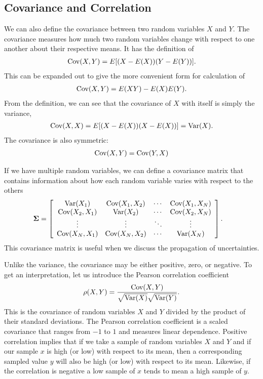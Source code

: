 \subsection{Covariance and Correlation}

We can also define the covariance between two random variables $X$ and $Y$. The covariance measures how much two random variables change with respect to one another about their respective means. It has the definition of
\begin{align}
  \textrm{Cov} (X,Y) = E[ (X - E(X) ) ( Y - E(Y) ) ] .
\end{align}
This can be expanded out to give the more convenient form for calculation of
\begin{align}
  \textrm{Cov} (X,Y) = E(XY) - E(X) E(Y) .
\end{align}
From the definition, we can see that the covariance of $X$ with itself is simply the variance,
\begin{align}
  \textrm{Cov} (X,X) = E[ (X - E(X) ) ( X - E(X) ) ] = \textrm{Var}(X) .
\end{align}
The covariance is also symmetric:
\begin{align}
  \textrm{Cov} (X,Y) = \textrm{Cov} (Y,X)
\end{align}

If we have multiple random variables, we can define a covariance matrix that contains information about how each random variable varies with respect to the others
\begin{align}
  \boldsymbol\Sigma &=
  \left[ \begin{array}{c c c c}
  \textrm{Var}(X_1)     & \textrm{Cov}(X_1,X_2) & \cdots & \textrm{Cov}(X_1,X_N) \\
  \textrm{Cov}(X_2,X_1) & \textrm{Var}(X_2)     & \cdots & \textrm{Cov}(X_2,X_N) \\
  \vdots        & \vdots        & \ddots & \vdots        \\
  \textrm{Cov}(X_N,X_1) & \textrm{Cov}(X_N,X_2) & \cdots & \textrm{Var}(X_N)     \\ \end{array} \right] .
\end{align}
This covariance matrix is useful when we discuss the propagation of uncertainties.

Unlike the variance, the covariance may be either positive, zero, or negative. To get an interpretation, let us introduce the Pearson correlation coefficient
\begin{align}
  \rho(X,Y) = \frac{ \textrm{Cov}(X,Y) }{ \sqrt{ \textrm{Var}(X) } \sqrt{ \textrm{Var}(Y) } } .
\end{align}
This is the covariance of random variables $X$ and $Y$ divided by the product of their standard deviations. The Pearson correlation coefficient is a scaled covariance that ranges from $-1$ to $1$ and measures linear dependence. Positive correlation implies that if we take a sample of random variables $X$ and $Y$ and if our sample $x$ is high (or low) with respect to its mean, then a corresponding sampled value $y$ will also be high (or low) with respect to its mean. Likewise, if the correlation is negative a low sample of $x$ tends to mean a high sample of $y$.

